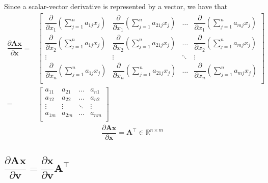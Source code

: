 \documentclass{article}
\newcommand{\trans}{\top}
\begin{document}
Since a scalar-vector derivative is represented by a vector, we have that
\begin{align}
    \dfrac{\partial \mathbf{A} \mathbf{x}}{\partial \mathbf{x}} = & \begin{bmatrix}
        \dfrac{\partial}{\partial x_1} \left( \sum_{j = 1}^n a_{1j}x_j \right) & 
        \dfrac{\partial}{\partial x_1} \left( \sum_{j = 1}^n a_{21j}x_j \right) & 
        \dots & 
        \dfrac{\partial}{\partial x_1} \left( \sum_{j = 1}^n a_{mj}x_j \right) \\
        \dfrac{\partial}{\partial x_2} \left( \sum_{j = 1}^n a_{1j}x_j \right) & 
        \dfrac{\partial}{\partial x_2} \left( \sum_{j = 1}^n a_{21j}x_j \right) & 
        \dots & 
        \dfrac{\partial}{\partial x_2} \left( \sum_{j = 1}^n a_{mj}x_j \right) \\
        \vdots & \vdots & \ddots & \vdots \\
        \dfrac{\partial}{\partial x_n} \left( \sum_{j = 1}^n a_{1j}x_j \right) & 
        \dfrac{\partial}{\partial x_n} \left( \sum_{j = 1}^n a_{21j}x_j \right) & 
        \dots & 
        \dfrac{\partial}{\partial x_n} \left( \sum_{j = 1}^n a_{mj}x_j \right) \\
    \end{bmatrix}  \\
    = & \begin{bmatrix}
        a_{11} & a_{21} & \dots & a_{n1} \\
        a_{12} & a_{22} & \dots & a_{n2} \\
        \vdots & \vdots & \ddots & \vdots \\
        a_{1m} & a_{2m} & \dots & a_{nm} \\
    \end{bmatrix}
\end{align}
\begin{align}
    \label{eq:lt-slution}
    \boxed{\dfrac{\partial \mathbf{A} \mathbf{x}}{\partial \mathbf{x}} = \mathbf{A}^\trans \in \mathbb{R}^{n\times m}}
\end{align}

\subsection{\(\dfrac{\partial \mathbf{A}  \mathbf{x}}{\partial \mathbf{v}} = \dfrac{\partial \mathbf{x}}{\partial \mathbf{v}} \mathbf{A}^\trans\)}
\end{document}
